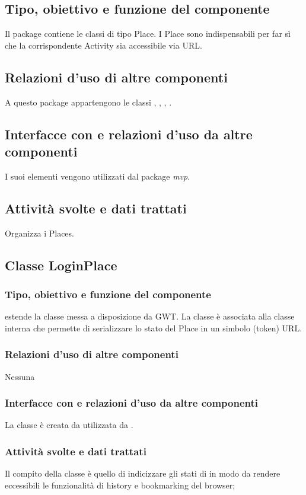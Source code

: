 \subsection*{Tipo, obiettivo e funzione del componente}
Il package contiene le classi di tipo Place. I Place sono indispensabili
per far s\`i che la corrispondente Activity sia accessibile via URL.
\subsection*{Relazioni d'uso di altre componenti}
A questo package appartengono le classi , ,
, .
\subsection*{Interfacce con e relazioni d'uso da altre componenti}
 I suoi elementi vengono utilizzati dal package \emph{mvp}.
\subsection*{Attivit\`a svolte e dati trattati}
Organizza i Places.

\subsection{Classe LoginPlace}
\subsubsection*{Tipo, obiettivo e funzione del componente}
 estende la classe  messa a disposizione da GWT. La
classe \`e associata alla classe interna  che permette di
serializzare lo stato del Place in un simbolo (token) URL.
\subsubsection*{Relazioni d'uso di altre componenti}
Nessuna
\subsubsection*{Interfacce con e relazioni d'uso da altre componenti}
La classe \`e creata da  utilizzata da .
\subsubsection*{Attivit\`a svolte e dati trattati}
Il compito della classe \`e quello di indicizzare gli stati di
 in modo da rendere eccessibili le funzionalit\`a di history e
bookmarking del browser;

